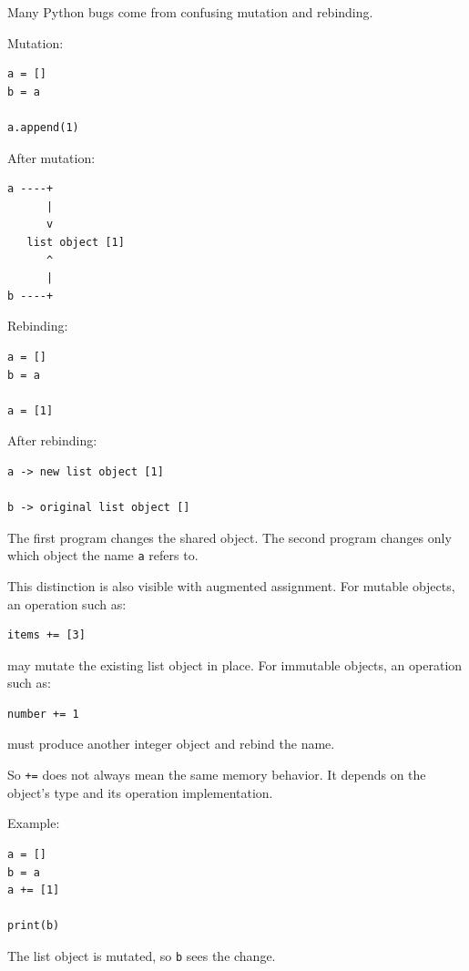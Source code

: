 Many Python bugs come from confusing mutation and rebinding.

Mutation:

\begin{verbatim}
a = []
b = a

a.append(1)
\end{verbatim}

After mutation:

\begin{verbatim}
a ----+
      |
      v
   list object [1]
      ^
      |
b ----+
\end{verbatim}

Rebinding:

\begin{verbatim}
a = []
b = a

a = [1]
\end{verbatim}

After rebinding:

\begin{verbatim}
a -> new list object [1]

b -> original list object []
\end{verbatim}

The first program changes the shared object. The second program changes only which object the name \texttt{a} refers to.

This distinction is also visible with augmented assignment. For mutable objects, an operation such as:

\begin{verbatim}
items += [3]
\end{verbatim}

may mutate the existing list object in place. For immutable objects, an operation such as:

\begin{verbatim}
number += 1
\end{verbatim}

must produce another integer object and rebind the name.

So \texttt{+=} does not always mean the same memory behavior. It depends on the object's type and its operation implementation.

Example:

\begin{verbatim}
a = []
b = a
a += [1]

print(b)
\end{verbatim}

The list object is mutated, so \texttt{b} sees the change.

